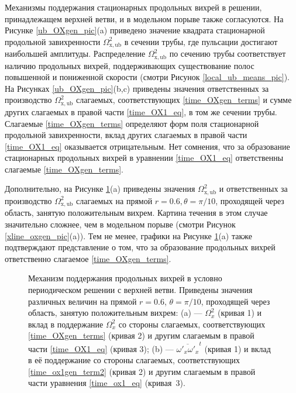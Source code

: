 Механизмы поддержания стационарных продольных вихрей в решении, принадлежащем верхней ветви, и в модельном порыве также согласуются. На Рисунке \ref{ub_OXgen_pic}(a) приведено значение квадрата стационарной продольной завихренности $\Omega_\mathrm{x, ub}^2$ в сечении трубы, где пульсации достигают наибольшей амплитуды. Распределение $\Omega_\mathrm{x,ub}^2$ по сечению трубы соответствует наличию продольных вихрей, поддерживающих существование полос повышенной и пониженной скорости (смотри Рисунок \ref{local_ub_means_pic}). На Рисунках \ref{ub_OXgen_pic}(b,c) приведены значения ответственных за производство $\Omega_\mathrm{x,ub}^2$ слагаемых, соответствующих \eqref{time_OXgen_terms} и сумме других слагаемых в правой части \eqref{time_OX1_eq}, в том же сечении трубы. Слагаемые \eqref{time_OXgen_terms} определяют форм поля стационарной продольной завихренности, вклад других слагаемых в правой части \eqref{time_OX1_eq} оказывается отрицательным. Нет сомнения, что за образование стационарных продольных вихрей в уравнении \eqref{time_OX1_eq} ответственны слагаемые \eqref{time_OXgen_terms}. 

Дополнительно, на Рисунке \ref{ub_oxgen_lines_pic}(a) приведены значения $\Omega_\mathrm{x, ub}^2$ и ответственных за производство $\Omega_\mathrm{x, ub}^2$ слагаемых на прямой $r = 0.6, \theta = \pi/10$, проходящей через область, занятую положительным вихрем. Картина течения в этом случае значительно сложнее, чем в модельном порыве (смотри Рисунок \ref{xline_oxgen_pic}(a)). Тем не менее, графики на Рисунке \ref{ub_oxgen_lines_pic}(a) также подтверждают представление о том, что за образование продольных вихрей ответственно слагаемое \eqref{time_OXgen_terms}. 
 

\begin{figure}
\caption{Механизм поддержания продольных вихрей в условно периодическом решении с верхней ветви. Приведены значения различных величин на прямой $r = 0.6$, $\theta = \pi/10$, проходящей через область, занятую положительным вихрем: (a) --- $\Omega_x^2$ (кривая 1) и вклад в поддержание $\Omega_x^2$ со стороны слагаемых, соответствующих \eqref{time_OXgen_terms} (кривая 2) и другим слагаемым в правой части \eqref{time_OX1_eq} (кривая 3); (b) --- $\overline{\omega'_x\omega'_x}^t$ (кривая 1) и вклад в её поддержание со стороны слагаемых, соответствующих \eqref{time_ox1gen_term2} (кривая 2) и другим слагаемым в правой части уравнения \eqref{time_ox1_eq} (кривая~3).} 
\label{ub_oxgen_lines_pic}
\end{figure}


